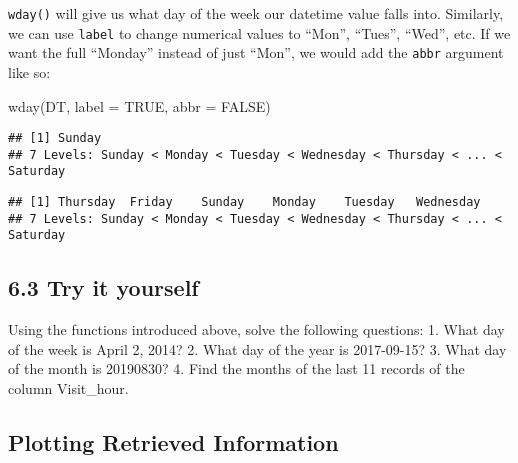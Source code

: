 \documentclass[
]{book}
\newenvironment{Shaded}{\begin{snugshade}}{\end{snugshade}}
\newcommand{\AttributeTok}[1]{\textcolor[rgb]{0.77,0.63,0.00}{#1}}
\newcommand{\ConstantTok}[1]{\textcolor[rgb]{0.00,0.00,0.00}{#1}}
\newcommand{\FunctionTok}[1]{\textcolor[rgb]{0.00,0.00,0.00}{#1}}
\newcommand{\NormalTok}[1]{#1}
\newcommand{\SpecialCharTok}[1]{\textcolor[rgb]{0.00,0.00,0.00}{#1}}
\begin{document}
\texttt{wday()} will give us what day of the week our datetime value falls into. Similarly, we can use \texttt{label} to change numerical values to ``Mon'', ``Tues'', ``Wed'', etc. If we want the full ``Monday'' instead of just ``Mon'', we would add the \texttt{abbr} argument like so:

\begin{Shaded}
\begin{Highlighting}[]
\FunctionTok{wday}\NormalTok{(DT, }\AttributeTok{label =} \ConstantTok{TRUE}\NormalTok{, }\AttributeTok{abbr =} \ConstantTok{FALSE}\NormalTok{)}
\end{Highlighting}
\end{Shaded}

\begin{verbatim}
## [1] Sunday
## 7 Levels: Sunday < Monday < Tuesday < Wednesday < Thursday < ... < Saturday
\end{verbatim}

\begin{Shaded}
\end{Shaded}

\begin{verbatim}
## [1] Thursday  Friday    Sunday    Monday    Tuesday   Wednesday
## 7 Levels: Sunday < Monday < Tuesday < Wednesday < Thursday < ... < Saturday
\end{verbatim}

\hypertarget{try-it-yourself-30}{%
\subsection{6.3 Try it yourself}\label{try-it-yourself-30}}

Using the functions introduced above, solve the following questions:
1. What day of the week is April 2, 2014?
2. What day of the year is 2017-09-15?
3. What day of the month is 20190830?
4. Find the months of the last 11 records of the column Visit\_hour.

\hypertarget{plotting-retrieved-information}{%
\subsection{Plotting Retrieved Information}\label{plotting-retrieved-information}}
\end{document}
